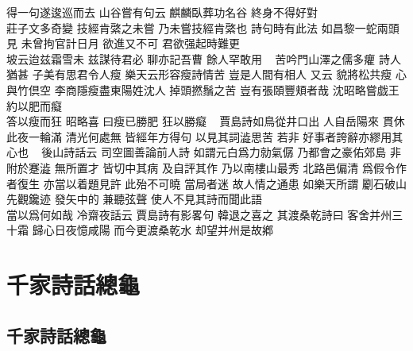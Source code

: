 得一句遂逡巡而去\gou%
山谷嘗有句云\gou%
麒麟臥葬功名谷\gou%
終身不得好對\gou%
~\\%
莊子文多奇變\gou%
技經肯綮之未嘗\gou%
乃未嘗技經肯綮也\gou%
詩句時有此法\gou%
如昌黎一蛇兩頭見\gou%
未曾拘官計日月\gou%
欲進又不可\gou%
君欲强起時難更\gou\\%
坡云迨兹霜雪未\gou%
兹謀待君必\gou%
聊亦記吾曹\gou%
餘人罕敢用\gou%
~%
苦吟門山澤之儒多癯\gou%
詩人猶甚\gou%
子美有思君令人瘦\gou%
樂天云形容瘦{}詩情苦\gou%
豈是人間有相人\gou%
又云\gou%
貌將松共瘦\gou%
心與竹倶空\gou%
李商隱瘦盡東陽姓沈人\gou%
掉頭撚鬚之苦\gou%
豈有張頤豐頬者哉\gou%
沈昭略嘗戯王約以肥而癡\gou\\%
答以瘦而狂\gou%
昭略喜\gou%
曰瘦已勝肥\gou%
狂以勝癡\gou%
~%
賈島詩如鳥從井口出\gou%
人自岳陽來\gou%
貫休此夜一輪滿\gou%
清光何處無\gou%
皆經年方得句\gou%
以見其詞澁思苦\gou%
若非\gou%
好事者誇辭亦繆用其心也\gou%
~%
後山詩話云\gou%
司空圖善論前人詩\gou%
如謂元白爲力勍氣僝\gou%
乃都會之豪佑郊島\gou%
非附於蹇澁\gou%
無所置才\gou%
皆切中其病\gou%
及自評其作\gou%
乃以南樓山最秀\gou%
北路邑偏清\gou%
爲假令作者復生\gou%
亦當以着題見許\gou%
此殆不可曉\gou%
當局者迷\gou%
故人情之通患\gou%
如樂天所謂\gou%
劚石破山\gou%
先觀鑱迹\gou%
發矢中的\gou%
兼聽弦聲\gou%
使人不見其詩而聞此語\gou\\%
當以爲何如哉\gou%
冷齋夜話云\gou%
賈島詩有影畧句\gou%
韓退之喜之\gou%
其渡桑乾詩曰\gou%
客舍并州三十霜\gou%
歸心日夜憶咸陽\gou%
而今更渡桑乾水\gou%
却望并州是故鄕\gou%

\clearpage


\chapter{千家詩話總龜}

\vspace*{4mm}

\section{千家詩話總龜}

\vspace*{13pt}
\normalsize



